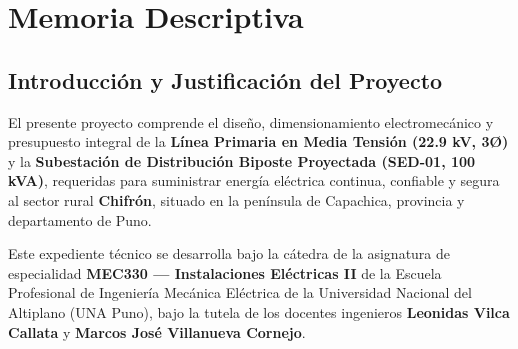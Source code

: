 \documentclass[12pt,a4paper]{report}
\begin{document}
\tableofcontents
\newpage
\listoftables
\newpage
\listoffigures
\newpage

\chapter{Memoria Descriptiva}

\section{Introducción y Justificación del Proyecto}
El presente proyecto comprende el diseño, dimensionamiento electromecánico y presupuesto integral de la \textbf{Línea Primaria en Media Tensión (22.9 kV, 3Ø)} y la \textbf{Subestación de Distribución Biposte Proyectada (SED-01, 100 kVA)}, requeridas para suministrar energía eléctrica continua, confiable y segura al sector rural \textbf{Chifrón}, situado en la península de Capachica, provincia y departamento de Puno.

Este expediente técnico se desarrolla bajo la cátedra de la asignatura de especialidad \textbf{MEC330 --- Instalaciones Eléctricas II} de la Escuela Profesional de Ingeniería Mecánica Eléctrica de la Universidad Nacional del Altiplano (UNA Puno), bajo la tutela de los docentes ingenieros \textbf{Leonidas Vilca Callata} y \textbf{Marcos José Villanueva Cornejo}.
\end{document}
